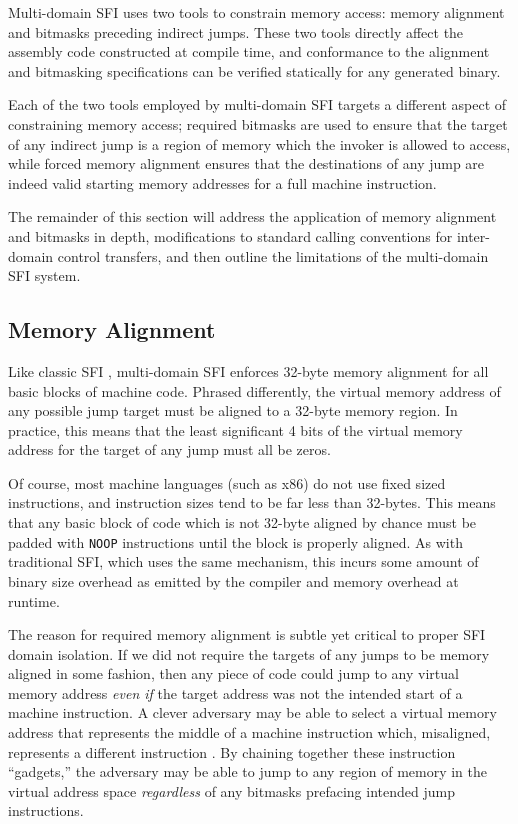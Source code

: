 \documentclass[12pt]{article}
\begin{document}
Multi-domain SFI uses two tools to constrain memory access: memory alignment and bitmasks preceding indirect jumps. These two tools directly affect the assembly code constructed at compile time, and conformance to the alignment and bitmasking specifications can be verified statically for any generated binary.

Each of the two tools employed by multi-domain SFI targets a different aspect of constraining memory access; required bitmasks are used to ensure that the target of any indirect jump is a region of memory which the invoker is allowed to access, while forced memory alignment ensures that the destinations of any jump are indeed valid starting memory addresses for a full machine instruction.

The remainder of this section will address the application of memory alignment and bitmasks in depth, modifications to standard calling conventions for inter-domain control transfers, and then outline the limitations of the multi-domain SFI system.

\subsection{Memory Alignment}

Like classic SFI \cite{mccamant_evaluating_2006, yee_native_2009, sehr_adapting_2010}, multi-domain SFI enforces 32-byte memory alignment for all basic blocks of machine code. Phrased differently, the virtual memory address of any possible jump target must be aligned to a 32-byte memory region. In practice, this means that the least significant 4 bits of the virtual memory address for the target of any jump must all be zeros.

Of course, most machine languages (such as x86) do not use fixed sized instructions, and instruction sizes tend to be far less than 32-bytes. This means that any basic block of code which is not 32-byte aligned by chance must be padded with \texttt{NOOP} instructions until the block is properly aligned. As with traditional SFI, which uses the same mechanism, this incurs some amount of binary size overhead as emitted by the compiler and memory overhead at runtime.

The reason for required memory alignment is subtle yet critical to proper SFI domain isolation. If we did not require the targets of any jumps to be memory aligned in some fashion, then any piece of code could jump to any virtual memory address \textit{even if} the target address was not the intended start of a machine instruction. A clever adversary may be able to select a virtual memory address that represents the middle of a machine instruction which, misaligned, represents a different instruction \cite{roemer_return-oriented_2012}. By chaining together these instruction ``gadgets,'' the adversary may be able to jump to any region of memory in the virtual address space \textit{regardless} of any bitmasks prefacing intended jump instructions.
\end{document}
